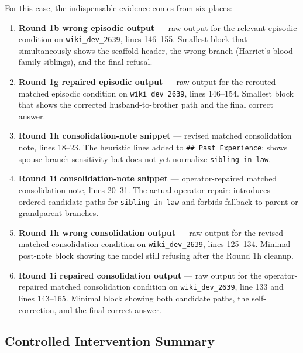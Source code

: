 For this case, the indispensable evidence comes from six places:

\begin{enumerate}
\item \textbf{Round 1b wrong episodic output} --- raw output for the relevant episodic condition on \texttt{wiki\_dev\_2639}, lines 146--155. Smallest block that simultaneously shows the scaffold header, the wrong branch (Harriet's blood-family siblings), and the final refusal.
\item \textbf{Round 1g repaired episodic output} --- raw output for the rerouted matched episodic condition on \texttt{wiki\_dev\_2639}, lines 146--154. Smallest block that shows the corrected husband-to-brother path and the final correct answer.
\item \textbf{Round 1h consolidation-note snippet} --- revised matched consolidation note, lines 18--23. The heuristic lines added to \texttt{\#\# Past Experience}; shows spouse-branch sensitivity but does not yet normalize \texttt{sibling-in-law}.
\item \textbf{Round 1i consolidation-note snippet} --- operator-repaired matched consolidation note, lines 20--31. The actual operator repair: introduces ordered candidate paths for \texttt{sibling-in-law} and forbids fallback to parent or grandparent branches.
\item \textbf{Round 1h wrong consolidation output} --- raw output for the revised matched consolidation condition on \texttt{wiki\_dev\_2639}, lines 125--134. Minimal post-note block showing the model still refusing after the Round 1h cleanup.
\item \textbf{Round 1i repaired consolidation output} --- raw output for the operator-repaired matched consolidation condition on \texttt{wiki\_dev\_2639}, line 133 and lines 143--165. Minimal block showing both candidate paths, the self-correction, and the final correct answer.
\end{enumerate}

\subsection{Controlled Intervention Summary}

